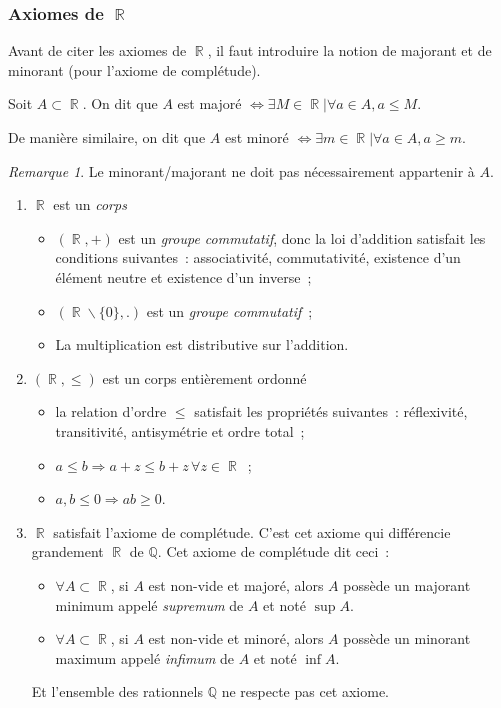 \documentclass{article}
\DeclareMathOperator{\R}{\mathbb R}
\theoremstyle{definition}
\theoremstyle{remark}
\newtheorem*{rmq}{Remarque}
\begin{document}
		\subsubsection{Axiomes de $\R$}
			Avant de citer les axiomes de $\R$, il faut introduire la notion de majorant et de minorant (pour l'axiome de complétude).

			Soit $A \subset \R$. On dit que $A$ est majoré $\iff \exists M \in \R | \forall a \in A, a \leq M$.

			De manière similaire, on dit que $A$ est minoré $\iff \exists m \in \R | \forall a \in A, a \geq m$.

			\begin{rmq} Le minorant/majorant ne doit pas nécessairement appartenir à $A$. \end{rmq}

			\begin{enumerate}
				\item $\R$ est un \textit{corps}
					\begin{itemize}
						\item $(\R, +)$ est un \textit{groupe commutatif}, donc la loi d'addition satisfait les conditions
							  suivantes~: associativité, commutativité, existence d'un élément neutre et existence d'un inverse~;
						\item $(\R \backslash \{0\}, .)$ est un \textit{groupe commutatif}~;
						\item La multiplication est distributive sur l'addition.
					\end{itemize}
				\item $(\R, \leq)$ est un corps entièrement ordonné
					\begin{itemize}
						\item la relation d'ordre $\leq$ satisfait les propriétés suivantes~: réflexivité, transitivité, antisymétrie
							  et ordre total~;
						\item $a \leq b \Rightarrow a + z \leq b + z \, \forall z \in \R$~;
						\item $a, b \leq 0 \Rightarrow ab \geq 0$.
					\end{itemize}
				\item $\R$ satisfait l'axiome de complétude. C'est cet axiome qui différencie grandement $\R$ de
					  $\mathbb Q$. Cet axiome de complétude dit ceci~:

					  \begin{itemize}
						\item $\forall A \subset \R$, si $A$ est non-vide et majoré, alors $A$ possède un majorant minimum appelé
							  \textit{supremum} de $A$ et noté $\sup A$.
						\item $\forall A \subset \R$, si $A$ est non-vide et minoré, alors $A$ possède un minorant maximum appelé
							  \textit{infimum} de $A$ et noté $\inf A$.
					  \end{itemize}

					  Et l'ensemble des rationnels $\mathbb Q$ ne respecte pas cet axiome.
			\end{enumerate}
\end{document}
